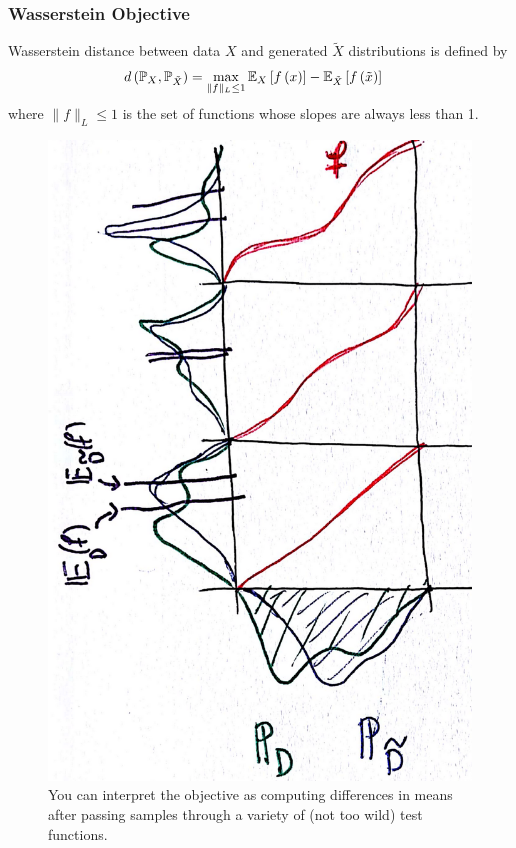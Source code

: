 \documentclass[10pt,mathserif]{beamer}
\begin{document}
\begin{frame}
  \frametitle{Wasserstein Objective}
  Wasserstein distance between data $X$ and generated $\tilde{X}$
  distributions is defined by
  \begin{align*}
    d\left(\mathbb{P}_X, \mathbb{P}_{\tilde{X}}\right) &= \max_{\|f\|_{L} \leq 1} \mathbb{E}_{X}\left[{f\left(x\right)}\right] - \mathbb{E}_{\tilde{X}}\left[{f\left(\tilde{x}\right)}\right]
  \end{align*}
  where $\|f\|_{L} \leq 1$ is the set of functions whose slopes are always less
  than 1.
  \begin{figure}[ht]
    \centering
    \includegraphics[width=0.2\paperwidth]{figure/wasserstein_tests}
    \caption{You can interpret the objective as computing differences in means
      after passing samples through a variety of (not too wild) test
      functions.\label{fig:wasserstein_tests} }
  \end{figure}
\end{frame}
\end{document}
